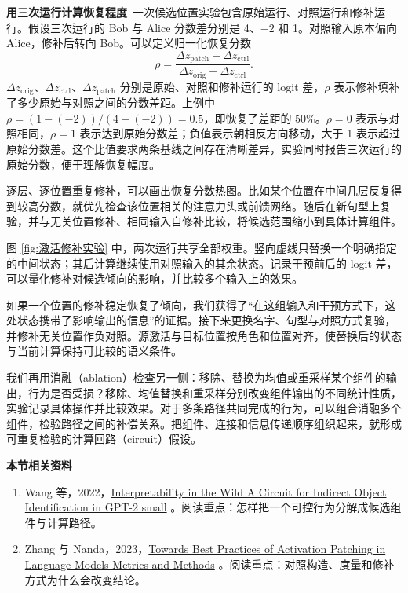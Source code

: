\textbf{用三次运行计算恢复程度}~一次候选位置实验包含原始运行、对照运行和修补运行。假设三次运行的 Bob 与 Alice 分数差分别是 4、$-2$ 和 1。对照输入原本偏向 Alice，修补后转向 Bob。可以定义归一化恢复分数
\[
\rho=\frac{\Delta z_{\mathrm{patch}}-\Delta z_{\mathrm{ctrl}}}
{\Delta z_{\mathrm{orig}}-\Delta z_{\mathrm{ctrl}}}.
\]
$\Delta z_{\mathrm{orig}}$、$\Delta z_{\mathrm{ctrl}}$、$\Delta z_{\mathrm{patch}}$ 分别是原始、对照和修补运行的 logit 差，$\rho$ 表示修补填补了多少原始与对照之间的分数差距。上例中 $\rho=(1-(-2))/(4-(-2))=0.5$，即恢复了差距的 50\%。$\rho=0$ 表示与对照相同，$\rho=1$ 表示达到原始分数差；负值表示朝相反方向移动，大于 1 表示超过原始分数差。这个比值要求两条基线之间存在清晰差异，实验同时报告三次运行的原始分数，便于理解恢复幅度。

逐层、逐位置重复修补，可以画出恢复分数热图。比如某个位置在中间几层反复得到较高分数，就优先检查该位置相关的注意力头或前馈网络。随后在新句型上复验，并与无关位置修补、相同输入自修补比较，将候选范围缩小到具体计算组件。

图 \ref{fig:激活修补实验} 中，两次运行共享全部权重。竖向虚线只替换一个明确指定的中间状态；其后计算继续使用对照输入的其余状态。记录干预前后的 logit 差，可以量化修补对候选倾向的影响，并比较多个输入上的效果。

如果一个位置的修补稳定恢复了倾向，我们获得了``在这组输入和干预方式下，这处状态携带了影响输出的信息''的证据。接下来更换名字、句型与对照方式复验，并修补无关位置作负对照。源激活与目标位置按角色和位置对齐，使替换后的状态与当前计算保持可比较的语义条件。

我们再用消融（ablation）检查另一侧：移除、替换为均值或重采样某个组件的输出，行为是否受损？移除、均值替换和重采样分别改变组件输出的不同统计性质，实验记录具体操作并比较效果。对于多条路径共同完成的行为，可以组合消融多个组件，检验路径之间的补偿关系。把组件、连接和信息传递顺序组织起来，就形成可重复检验的计算回路（circuit）假设。

\textbf{本节相关资料}
\begin{enumerate}
    \item Wang 等，2022，\href{https://arxiv.org/abs/2211.00593}{Interpretability in the Wild A Circuit for Indirect Object Identification in GPT-2 small} 。阅读重点：怎样把一个可控行为分解成候选组件与计算路径。
    \item Zhang 与 Nanda，2023，\href{https://arxiv.org/abs/2309.16042}{Towards Best Practices of Activation Patching in Language Models Metrics and Methods} 。阅读重点：对照构造、度量和修补方式为什么会改变结论。
\end{enumerate}

